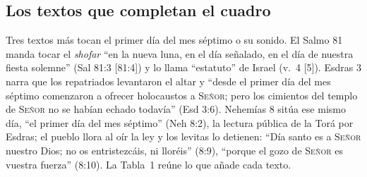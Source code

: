 \documentclass[11pt,letterpaper]{article}
\newcommand{\SENOR}{\textsc{Señor}}
\begin{document}
\subsection{Los textos que completan el cuadro}
Tres textos más tocan el primer día del mes séptimo o su sonido. El Salmo 81 manda tocar el \emph{shofar} ``en la nueva luna, en el día señalado, en el día de nuestra fiesta solemne'' (Sal 81:3 [81:4]) y lo llama ``estatuto'' de Israel (v.~4 [5]). Esdras 3 narra que los repatriados levantaron el altar y ``desde el primer día del mes séptimo comenzaron a ofrecer holocaustos a \SENOR; pero los cimientos del templo de \SENOR{} no se habían echado todavía'' (Esd 3:6). Nehemías 8 sitúa ese mismo día, ``el primer día del mes séptimo'' (Neh 8:2), la lectura pública de la Torá por Esdras; el pueblo llora al oír la ley y los levitas lo detienen: ``Día santo es a \SENOR{} nuestro Dios; no os entristezcáis, ni lloréis'' (8:9), ``porque el gozo de \SENOR{} es vuestra fuerza'' (8:10). La Tabla~1 reúne lo que añade cada texto.
\end{document}
